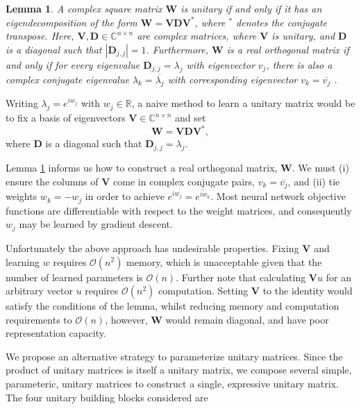 \documentclass{article} %
\newcommand{\matr}[1]{\mathbf{#1}}
\newcommand\RR{\mathbb{R}}
\newtheorem{lemma}{Lemma}
\begin{document}
\begin{lemma}
  A complex square matrix $\matr{W}$ is unitary if and only if it has an eigendecomposition of the form
  $\matr{W} = \matr{V} \matr{D} \matr{V}^*$, where $^*$ denotes the conjugate transpose.
  Here, $\matr{V}, \matr{D} \in \mathbb{C}^{n \times n}$ are
  complex matrices, where $\matr{V}$ is unitary, and $\matr{D}$ is a diagonal such that $|\matr{D}_{j,j}|=1$. 
  Furthermore, $\matr{W}$ is a real orthogonal matrix if and only if for every eigenvalue $\matr{D}_{j,j} 
  = \lambda_j$ with eigenvector $v_j$, there is also a complex conjugate
  eigenvalue $\lambda_k = \overline{\lambda_j}$ with 
  corresponding eigenvector $v_k = \overline{v_j}$ .
\label{lemma}
\end{lemma}

Writing $\lambda_j = e^{i w_j}$ with $w_j \in \RR$, a naive method to learn a unitary matrix would be to
fix a basis of eigenvectors $\matr{V} \in \mathbb{C}^{n \times n}$ and set
\begin{equation} \matr{W} = \matr{V} \matr{D} \matr{V}^{*} , \end{equation}
\vspace{-0.5mm}
where $\matr{D}$ is a diagonal such that $\matr{D}_{j,j} = \lambda_j$. 

Lemma \ref{lemma} informs us how to construct a real orthogonal matrix, $\matr{W}$.
We must (i) ensure the columns of $\matr{V}$ come in complex conjugate pairs, $v_k = \overline{v_j}$, and
(ii) tie weights $w_k=-w_j$ in order to achieve $e^{i w_j} = \overline{e^{i w_k}}$. 
Most neural network objective functions are differentiable with respect to the weight matrices,
and consequently $w_j$ may be learned by gradient descent. 

Unfortunately the above approach has undesirable properties. 
Fixing $\matr{V}$ and learning $w$ requires $\mathcal{O}\left(n^2\right)$ memory, 
which is unacceptable given that the number of learned parameters is $\mathcal{O}(n)$. 
Further note that calculating $\matr{V} u$ for an arbitrary vector $u$ 
requires $\mathcal{O}(n^2)$ computation. 
Setting $\matr{V}$ to the identity would satisfy the conditions of the lemma, whilst reducing  
memory and computation requirements to $\mathcal{O}(n)$, however, $\matr{W}$ would remain diagonal, 
and have poor representation capacity.

We propose an alternative strategy to parameterize unitary matrices. 
Since the product of unitary matrices is itself a unitary matrix, we 
compose several simple, parameteric, unitary matrices to construct a single, expressive unitary matrix.
The four unitary building blocks considered are 
\end{document}
